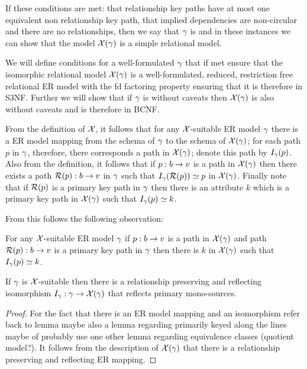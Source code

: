 If these conditions are met: that relationship key paths have at most one equivalent non relationship key path, that implied dependencies are non-circular and there are no   relationships, then we say that $\gamma$ is  and in these instances we can show that 
the model $\mathcal{X}(\gamma)$ is a simple relational model. 

We will define conditions for a well-formulated $\gamma$  that if met ensure 
 that the isomorphic relational model $\mathcal{X}(\gamma)$ is a well-formulated, reduced, restriction free relational ER model with the fd factoring property 
ensuring that it is therefore in S3NF.  Further we will show that if $\gamma$ is without caveats then $\mathcal{X}(\gamma)$ is also without caveats and is therefore in BCNF. 

From the definition of $\mathcal{X}$, it follows that for any $\mathcal{X}$-suitable ER model $\gamma$ there is a ER model mapping from the schema of $\gamma$ to the schema of $\mathcal{X}(\gamma)$; for each path $p$ in $\gamma$, therefore, there corresponds a path 
in $\mathcal{X}(\gamma)$; denote this path by  $I_\gamma(p)$. 
Also from the definition, it follows that
if $p:b \rightarrow v$ is a path in $\mathcal{X}(\gamma)$ then there exists a path $\mathcal{R}(p):b \rightarrow v$ in $\gamma$ such that $I_\gamma(\mathcal{R}(p)) \simeq p$ in $\mathcal{X}(\gamma)$. Finally note that if $\mathcal{R}(p)$ is a primary key path in $\gamma$ then there is an attribute $k$ which is a primary key path
in $\mathcal{X}(\gamma)$ such that $I_\gamma(p) \simeq k$. 


From this follows the following observation:

\begin{observation}
For any $\mathcal{X}$-suitable ER model $\gamma$ if $p:b \rightarrow v$ is a path in $\mathcal{X}(\gamma)$ and  path $\mathcal{R}(p):b \rightarrow v$ is a primary key path in $\gamma$  then there is 
  $k$ in $\mathcal{X}(\gamma)$ such that $I_\gamma(p) \simeq k$. 
\end{observation}

\begin{lemma}
If $\gamma$ is $\mathcal{X}$-suitable  then  there is a 
relationship preserving  and reflecting isomorphism $I_\gamma: \gamma \rightarrow \mathcal{X}(\gamma)$ that reflects primary mono-sources.
\end{lemma}
\begin{proof}

For the fact that there is an ER model mapping and an isomorphism refer back to lemma  maybe also a lemma regarding primarily keyed along the lines maybe of
 probably use one other lemma regarding equivalence classes (quotient model?).
It follows from the description of $\mathcal{X}(\gamma)$ that there is a relationship preserving and reflecting  ER mapping.
\tbd 
\end{proof}

